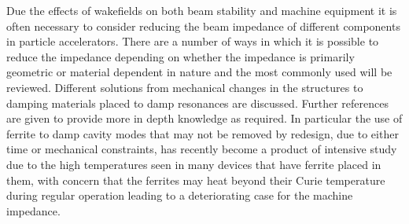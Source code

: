 \label{chap:ImpRedTech}

Due the effects of wakefields on both beam stability and machine equipment it is often necessary to consider reducing the beam impedance of different components in particle accelerators. There are a number of ways in which it is possible to reduce the impedance depending on whether the impedance is primarily geometric or material dependent in nature and the most commonly used will be reviewed. Different solutions from mechanical changes in the structures to damping materials placed to damp resonances are discussed. Further references are given to provide more in depth knowledge as required. In particular the use of ferrite to damp cavity modes that may not be removed by redesign, due to either time or mechanical constraints, has recently become a product of intensive study due to the high temperatures seen in many devices that have ferrite placed in them, with concern that the ferrites may heat beyond their Curie temperature during regular operation leading to a deteriorating case for the machine impedance. 